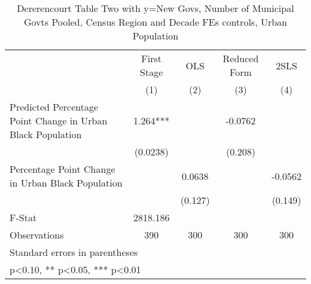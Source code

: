\begin{table}[htbp]\centering
\def\sym#1{\ifmmode^{#1}\else\(^{#1}\)\fi}
\caption{Dererencourt Table Two with y=New Govs, Number of Municipal Govts  Pooled, Census Region and Decade FEs controls, Urban Population}
\begin{tabular}{l*{4}{c}}
\toprule
                    & First Stage   &         OLS   &Reduced Form   &        2SLS   \\
                    &\multicolumn{1}{c}{(1)}   &\multicolumn{1}{c}{(2)}   &\multicolumn{1}{c}{(3)}   &\multicolumn{1}{c}{(4)}   \\
\midrule
Predicted Percentage Point Change in Urban Black Population&       1.264***&               &     -0.0762   &               \\
                    &    (0.0238)   &               &     (0.208)   &               \\
\addlinespace
Percentage Point Change in Urban Black Population&               &      0.0638   &               &     -0.0562   \\
                    &               &     (0.127)   &               &     (0.149)   \\
\midrule
F-Stat              &    2818.186   &               &               &               \\
Observations        &         390   &         300   &         300   &         300   \\
\bottomrule
\multicolumn{5}{l}{\footnotesize Standard errors in parentheses}\\
\multicolumn{5}{l}{\footnotesize * p<0.10, ** p<0.05, *** p<0.01}\\
\end{tabular}
\end{table}
